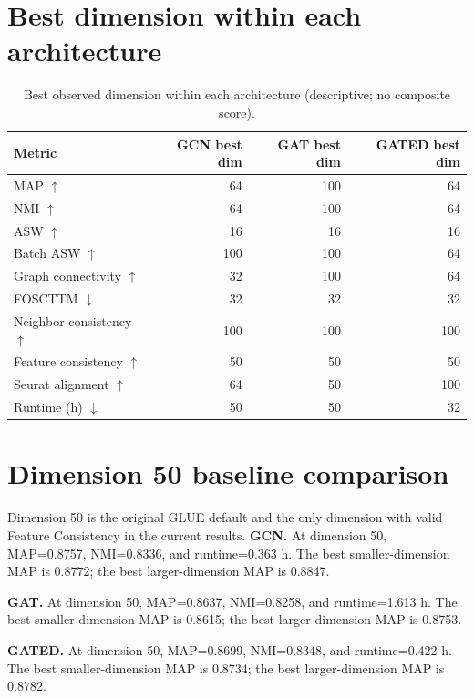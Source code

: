 \documentclass[10pt]{article}
\begin{document}
\section{Best dimension within each architecture}
\begin{table}[H]
\centering
\small
\caption{Best observed dimension within each architecture (descriptive; no composite score).}
\begin{tabular}{@{}lrrr@{}}
\toprule
Metric & GCN best dim & GAT best dim & GATED best dim \\
\midrule
MAP $\uparrow$ & 64 & 100 & 64 \\
NMI $\uparrow$ & 64 & 100 & 64 \\
ASW $\uparrow$ & 16 & 16 & 16 \\
Batch ASW $\uparrow$ & 100 & 100 & 64 \\
Graph connectivity $\uparrow$ & 32 & 100 & 64 \\
FOSCTTM $\downarrow$ & 32 & 32 & 32 \\
Neighbor consistency $\uparrow$ & 100 & 100 & 100 \\
Feature consistency $\uparrow$ & 50 & 50 & 50 \\
Seurat alignment $\uparrow$ & 64 & 50 & 100 \\
Runtime (h) $\downarrow$ & 50 & 50 & 32 \\
\bottomrule
\end{tabular}
\end{table}
\section{Dimension 50 baseline comparison}
Dimension 50 is the original GLUE default and the only dimension with valid Feature Consistency in the current results.
\textbf{GCN.} At dimension 50, MAP=0.8757, NMI=0.8336, and runtime=0.363 h. The best smaller-dimension MAP is 0.8772; the best larger-dimension MAP is 0.8847.

\textbf{GAT.} At dimension 50, MAP=0.8637, NMI=0.8258, and runtime=1.613 h. The best smaller-dimension MAP is 0.8615; the best larger-dimension MAP is 0.8753.

\textbf{GATED.} At dimension 50, MAP=0.8699, NMI=0.8348, and runtime=0.422 h. The best smaller-dimension MAP is 0.8734; the best larger-dimension MAP is 0.8782.
\end{document}
